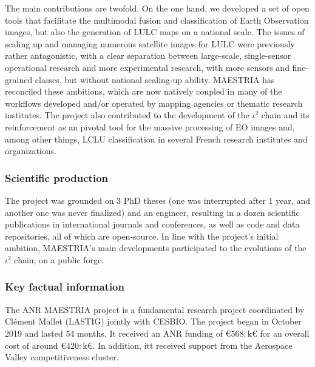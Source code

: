 The main contributions are twofold. On the one hand, we developed a set of open tools that facilitate the multimodal fusion and classification of Earth Observation images, but also the generation of LULC maps on a national scale. The issues of scaling up and managing numerous satellite images for LULC were previously rather antagonistic, with a clear separation between large-scale, single-sensor operational research and more experimental research, with more sensors and fine-grained classes, but without national scaling-up ability. MAESTRIA has reconciled these ambitions, which are now natively coupled in many of the workflows developed and/or operated by mapping agencies or thematic research institutes.
The project also contributed to the development of the $\iota^2$ chain and its reinforcement as an pivotal tool for the massive processing of EO images and, among other things, LCLU classification in several French research institutes and organizations.


\subsubsection*{Scientific production}
The project was grounded on 3 PhD theses (one was interrupted after 1 year, and another one was never finalized) and an engineer, resulting in a dozen scientific publications in international journals and conferences, as well as code and data repositories, all of which are open-source. In line with the project's initial ambition, MAESTRIA's main developments participated to the  evolutions of the \href{https://framagit.org/iota2-project/iota2}{$\iota^2$} chain, on a public forge.

\subsubsection*{Key factual information}
The ANR MAESTRIA project is a fundamental research project coordinated by Clément Mallet (LASTIG) jointly with CESBIO. The project began in October 2019 and lasted 54 months. It received an ANR funding of €568$:$k€ for an overall cost of around €420$:$k€. In addition, itt received support from the Aerospace Valley competitiveness cluster.